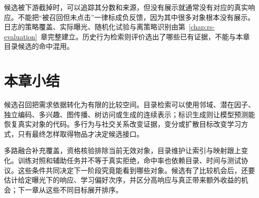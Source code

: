 候选被下游截掉时，可以追踪其分数和来源，但没有展示就通常没有对应的真实响应。不能把“被召回但未点击”一律标成负反馈，因为其中很多对象根本没有展示。日志的策略覆盖、实际曝光、随机化试验与离策略识别由第~\ref{chap:rs-evaluation}~章完整建立。历史行为检索则评价选出了哪些已有证据，不能与本章目录候选的命中混用。

\section{本章小结}
\label{sec:rs-retrieval-summary}

候选召回把需求依据转化为有限的比较空间。目录检索可以使用邻域、潜在因子、独立编码、多兴趣、图传播、树访问或生成的连续表示；标识生成则让模型预测能恢复真实对象的代码。多行为与社交关系改变证据，变分或扩散目标改变学习方式，只有最终怎样取得物品才决定候选接口。

多路融合补充覆盖，资格核验排除当前无效对象，目录维护让索引与映射跟上变化。训练对照和辅助任务并不等于真实拒绝，命中率也依赖目录、时间与测试协议。这些条件共同决定下一阶段究竟能看到哪些对象。候选有了比较机会后，还要估计给定曝光下的响应、学习偏好次序，并区分高响应与真正带来额外收益的机会；下一章从这些不同目标展开排序。
